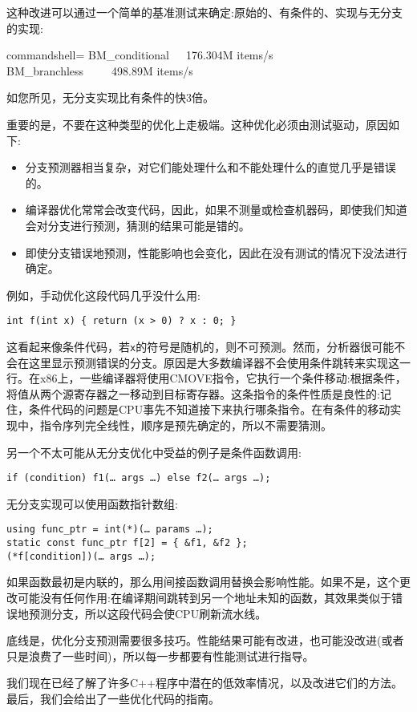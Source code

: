 这种改进可以通过一个简单的基准测试来确定:原始的、有条件的、实现与无分支的实现:

\begin{tcblisting}{commandshell={}}
BM_conditional   176.304M items/s
BM_branchless     498.89M items/s
\end{tcblisting}

如您所见，无分支实现比有条件的快3倍。

重要的是，不要在这种类型的优化上走极端。这种优化必须由测试驱动，原因如下:

\begin{itemize}
\item
分支预测器相当复杂，对它们能处理什么和不能处理什么的直觉几乎是错误的。

\item
编译器优化常常会改变代码，因此，如果不测量或检查机器码，即使我们知道会对分支进行预测，猜测的结果可能是错的。

\item
即使分支错误地预测，性能影响也会变化，因此在没有测试的情况下没法进行确定。
\end{itemize}

例如，手动优化这段代码几乎没什么用:

\begin{lstlisting}[style=styleCXX]
int f(int x) { return (x > 0) ? x : 0; }
\end{lstlisting}

这看起来像条件代码，若\texttt{x}的符号是随机的，则不可预测。然而，分析器很可能不会在这里显示预测错误的分支。原因是大多数编译器不会使用条件跳转来实现这一行。在x86上，一些编译器将使用CMOVE指令，它执行一个条件移动:根据条件，将值从两个源寄存器之一移动到目标寄存器。这条指令的条件性质是良性的:记住，条件代码的问题是CPU事先不知道接下来执行哪条指令。在有条件的移动实现中，指令序列完全线性，顺序是预先确定的，所以不需要猜测。 

另一个不太可能从无分支优化中受益的例子是条件函数调用:

\begin{lstlisting}[style=styleCXX]
if (condition) f1(… args …) else f2(… args …);
\end{lstlisting}

无分支实现可以使用函数指针数组:

\begin{lstlisting}[style=styleCXX]
using func_ptr = int(*)(… params …);
static const func_ptr f[2] = { &f1, &f2 };
(*f[condition])(… args …);
\end{lstlisting}

如果函数最初是内联的，那么用间接函数调用替换会影响性能。如果不是，这个更改可能没有任何作用:在编译期间跳转到另一个地址未知的函数，其效果类似于错误地预测分支，所以这段代码会使CPU刷新流水线。 

底线是，优化分支预测需要很多技巧。性能结果可能有改进，也可能没改进(或者只是浪费了一些时间)，所以每一步都要有性能测试进行指导。

我们现在已经了解了许多C++程序中潜在的低效率情况，以及改进它们的方法。最后，我们会给出了一些优化代码的指南。




